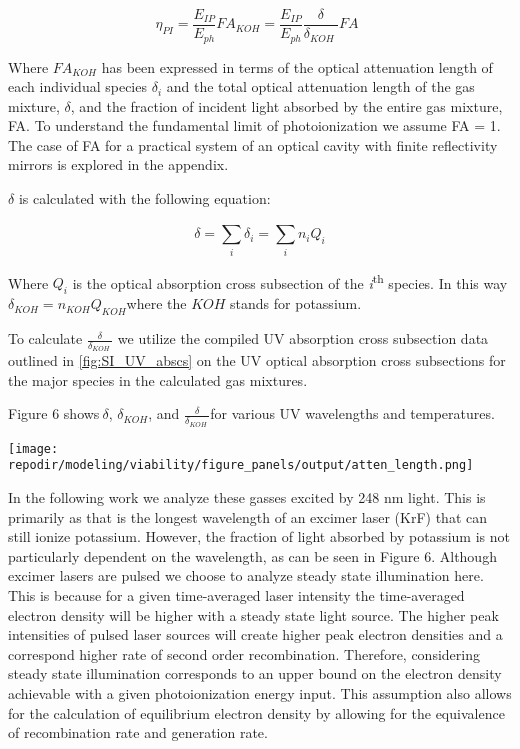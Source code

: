 \begin{equation}
\eta_{PI} = \frac{E_{IP}}{E_{ph}}FA_{KOH} = \frac{E_{IP}}{E_{ph}}\frac{\delta}{\delta_{KOH}\ }FA\ \ 
\end{equation}

Where \(FA_{KOH}\) has been expressed in terms of the optical attenuation length of each individual species \(\delta_{i}\) and the total optical attenuation length of the gas mixture, \(\delta\), and the fraction of incident light absorbed by the entire gas mixture, FA. To understand the fundamental limit of photoionization we assume FA = 1. The case of FA for a practical system of an optical cavity with finite reflectivity mirrors is explored in the appendix.

\(\delta\) is calculated with the following equation:

\begin{equation}
\delta = \sum_{i}^{}\delta_{i} = \sum_{i}^{}{n_{i}Q_{i}}
\end{equation}

Where \(Q_{i}\) is the optical absorption cross subsection of the \emph{i}\textsuperscript{th} species. In this way \(\delta_{KOH} = n_{KOH}Q_{KOH}\)where the \(KOH\) stands for potassium.

To calculate \(\frac{\delta}{\delta_{KOH}\ }\) we utilize the compiled UV absorption cross subsection data outlined in \ref{fig:SI_UV_abscs} on the UV optical absorption cross subsections for the major species in the calculated gas mixtures.

Figure 6 shows\(\ \delta\), \(\delta_{KOH}\), and \(\frac{\delta}{\delta_{KOH}\ }\)for various UV wavelengths and temperatures.

\texttt{[image: \\repodir/modeling/viability/figure\_panels/output/atten\_length.png]}

In the following work we analyze these gasses excited by 248 nm light. This is primarily as that is the longest wavelength of an excimer laser (KrF) that can still ionize potassium. However, the fraction of light absorbed by potassium is not particularly dependent on the wavelength, as can be seen in Figure 6. Although excimer lasers are pulsed we choose to analyze steady state illumination here. This is because for a given time-averaged laser intensity the time-averaged electron density will be higher with a steady state light source. The higher peak intensities of pulsed laser sources will create higher peak electron densities and a correspond higher rate of second order recombination. Therefore, considering steady state illumination corresponds to an upper bound on the electron density achievable with a given photoionization energy input. This assumption also allows for the calculation of equilibrium electron density by allowing for the equivalence of recombination rate and generation rate.

